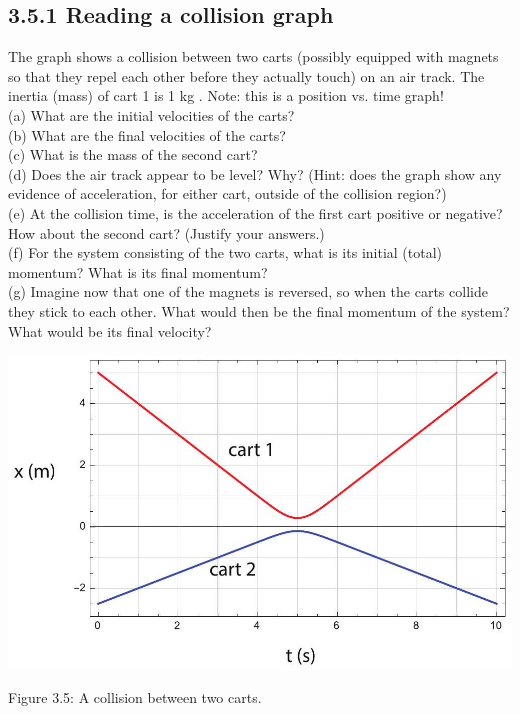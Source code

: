 \documentclass[10pt]{article}
\begin{document}
\subsection*{3.5.1 Reading a collision graph}
The graph shows a collision between two carts (possibly equipped with magnets so that they repel each other before they actually touch) on an air track. The inertia (mass) of cart 1 is 1 kg . Note: this is a position vs. time graph!\\
(a) What are the initial velocities of the carts?\\
(b) What are the final velocities of the carts?\\
(c) What is the mass of the second cart?\\
(d) Does the air track appear to be level? Why? (Hint: does the graph show any evidence of acceleration, for either cart, outside of the collision region?)\\
(e) At the collision time, is the acceleration of the first cart positive or negative? How about the second cart? (Justify your answers.)\\
(f) For the system consisting of the two carts, what is its initial (total) momentum? What is its final momentum?\\
(g) Imagine now that one of the magnets is reversed, so when the carts collide they stick to each other. What would then be the final momentum of the system? What would be its final velocity?

\begin{center}
\includegraphics[max width=\textwidth]{2024_09_14_9969b06773f10b6936e8g-081}
\end{center}

Figure 3.5: A collision between two carts.
\end{document}
